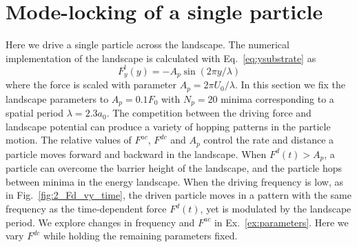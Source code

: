 \documentclass[twocolumn,showpacs,preprintnumbers,amsmath,amssymb,aps,prb]{revtex4}
\begin{document}
\section{Mode-locking of a single particle}
\label{sec:results}
Here we drive 
a single particle 
across the landscape. 
The numerical implementation of the landscape 
is calculated with Eq.~\ref{eq:ysubstrate} as 
\begin{equation}
  \label{eq:force}
  F^l_y(y) = -A_{p} \sin{(2 \pi y / \lambda)} 
\end{equation}
where the force is scaled with parameter $A_{p} = 2\pi U_0/\lambda$.
In this section we fix the landscape parameters
to $A_{p} = 0.1 F_0$ 
with $N_p=20$ minima 
corresponding to a spatial period $\lambda = 2.3 a_0$.
The competition between the driving force and landscape potential
can produce a variety of hopping patterns in the particle motion. 
The relative values of $F^{ac}$, $F^{dc}$ and $A_p$
control the rate and distance a  particle moves 
forward and backward in the landscape.
When $F^d(t) > A_p$, a particle can 
overcome the barrier height of the landscape,
and 
the particle hops between minima in the energy landscape.
When the driving frequency is low,
as in Fig.~\ref{fig:2_Fd_vy_time},  
the driven particle 
moves 
in a pattern 
with the same frequency 
as the time-dependent force $F^d(t)$,
yet is modulated by the landscape period.
We explore changes in frequency and $F^{ac}$ 
in Ex.~\ref{ex:parameters}.
Here we vary $F^{dc}$ 
while holding the remaining parameters fixed.
\end{document}
